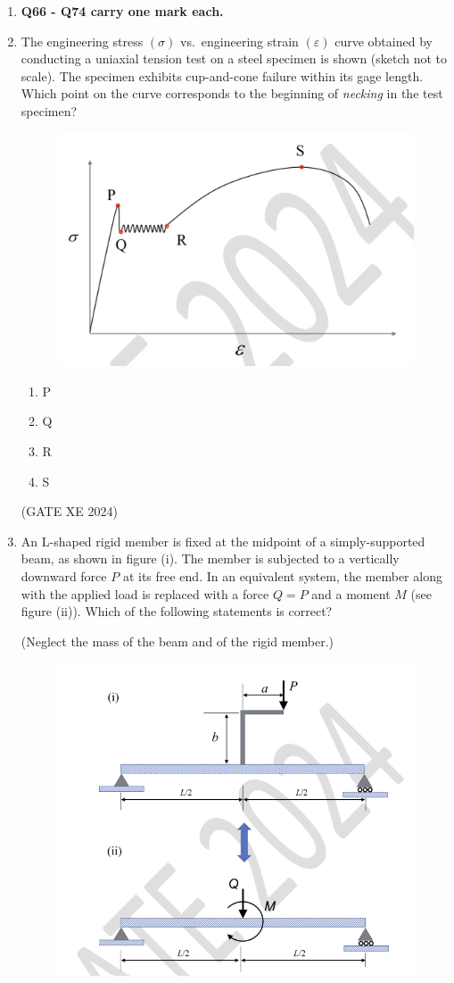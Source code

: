 \documentclass[12pt]{article}
\begin{document}
\begin{enumerate}
\newpage

\begin{center}
    {\Large \textbf{SOLID MECHANICS (XE - D)}}
\end{center}

\item[] \textbf{Q66 - Q74 carry one mark each.}
\item The engineering stress $(\sigma)$ vs.\ engineering strain $(\varepsilon)$ curve obtained by conducting a uniaxial tension test on a steel specimen is shown (sketch not to scale). The specimen exhibits cup-and-cone failure within its gage length. Which point on the curve corresponds to the beginning of \emph{necking} in the test specimen?

\begin{figure}[H]
    \centering
    \includegraphics[width=0.5\columnwidth]{figs/ass5_d_q66.png}
    \caption{}
    \label{fig:placeholder}
\end{figure}

\begin{enumerate}
\item P
\item Q
\item R
\item S
\end{enumerate}

(GATE XE 2024)

\item An L-shaped rigid member is fixed at the midpoint of a simply-supported beam, as shown in figure (i). The member is subjected to a vertically downward force $P$ at its free end. In an equivalent system, the member along with the applied load is replaced with a force $Q=P$ and a moment $M$ (see figure (ii)). Which of the following statements is correct?

(Neglect the mass of the beam and of the rigid member.)

\begin{figure}[H]
    \centering
    \includegraphics[width=0.5\columnwidth]{figs/ass5_d_q67.png}
    \caption{}
    \label{fig:placeholder}
\end{figure}


\end{enumerate}
\end{document}
